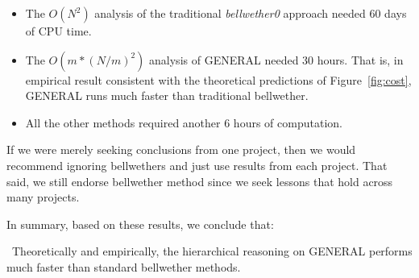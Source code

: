\documentclass[10pt,journal,compsoc]{IEEEtran}
\newcommand{\fig}[1]{Figure~\ref{fig:#1}}
\newcommand{\bi}{\begin{itemize}}
\newcommand{\ei}{\end{itemize}}
\newenvironment{RQ}[1]%
{\noindent\begin{minipage}[c]{\linewidth}%
\begin{bclogo}[couleur=gray!20,%
                arrondi=0.1,logo=\bctrombone,%
                ombre=true%
                ]{{\small  ~#1}}}%
{\end{bclogo}\vspace{2mm}\end{minipage}}
\begin{document}
\bi
\item
The $O(N^2)$ analysis of the traditional {\em bellwether0} approach needed 60 days of CPU time.
\item 
The $O(m*(N/m)^2)$ analysis
of GENERAL needed 30  hours. That is, in empirical result consistent with the theoretical predictions of \fig{cost}, GENERAL runs much faster than traditional bellwether.
\item 
All the other methods required another 6 hours of computation. 
\ei

If we were merely seeking conclusions from one project, then we would recommend ignoring bellwethers and just use results from each project. That said, we still endorse bellwether method since  we seek lessons that hold across many projects.

In summary, based on these results, we conclude that:


\begin{RQ}{Theoretically and empirically, the  hierarchical reasoning on GENERAL performs much faster than standard bellwether methods.}
\end{RQ}
\end{document}
